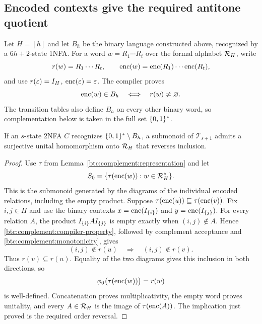 \subsection{Encoded contexts give the required antitone quotient}

Let $H=[h]$ and let $B_h$ be the binary language constructed above,
recognized by a $6h+2$-state 1NFA. For a word $w=R_1\cdots R_t$ over the formal
alphabet $\mathcal{R}_{H}$, write
\[
 r(w)=R_1\cdots R_t,\qquad
 \operatorname{enc}(w)=\operatorname{enc}(R_1)\cdots\operatorname{enc}(R_t),
\]
and use $r(\varepsilon)=I_H$, $\operatorname{enc}(\varepsilon)=\varepsilon$. The compiler proves
\begin{equation}\label{btc:complement:compiler-property}
 \operatorname{enc}(w)\in B_h\quad\Longleftrightarrow\quad r(w)\ne\varnothing.
\end{equation}
The transition tables also define $B_h$ on every other binary word,
so complementation below is taken in the full set $\{0,1\}^*$.

\begin{proposition}\label{btc:complement:quotient}
If an $s$-state 2NFA $C$ recognizes $\{0,1\}^*\setminus B_h$, a
submonoid of $\mathcal T_{s+1}$ admits a surjective unital
homomorphism onto $\mathcal{R}_{H}$ that reverses inclusion.
\end{proposition}

\begin{proof}
Use $\tau$ from Lemma~\ref{btc:complement:representation} and let
\[
 S_0=\{\tau(\operatorname{enc}(w)):w\in\mathcal{R}_{H}^{*}\}.
\]
This is the submonoid generated by the diagrams of the individual
encoded relations, including the empty product. Suppose
$\tau(\operatorname{enc}(u))\sqsubseteq\tau(\operatorname{enc}(v))$.
Fix $i,j\in H$ and use the binary contexts
$x=\operatorname{enc}(I_{\{i\}})$ and $y=\operatorname{enc}(I_{\{j\}})$.
For every relation $A$, the product $I_{\{i\}}AI_{\{j\}}$
is empty exactly when $(i,j)\notin A$. Hence
\eqref{btc:complement:compiler-property}, followed by complement
acceptance and \eqref{btc:complement:monotonicity}, gives
\[
 (i,j)\notin r(u)\quad\Longrightarrow\quad(i,j)\notin r(v).
\]
Thus $r(v)\subseteq r(u)$. Equality of the two diagrams gives this
inclusion in both directions, so
\[
 \phi_0\bigl(\tau(\operatorname{enc}(w))\bigr)=r(w)
\]
is well-defined. Concatenation proves multiplicativity, the empty
word proves unitality, and every $A\in\mathcal{R}_{H}$ is the image of
$\tau(\operatorname{enc}(A))$. The implication just proved is the required
order reversal.
\end{proof}

